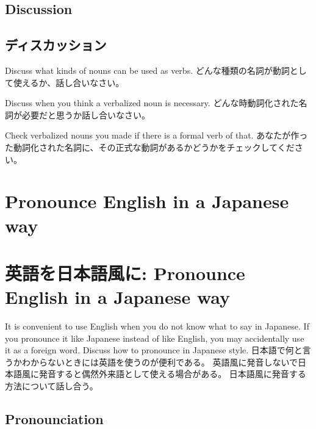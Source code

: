 \documentclass[uplatex,dvipdfmx,b5paper,english,10pt]{jsbook}
\begin{document}
\ifEnglish
\subsection{Discussion}
\else
\subsection{ディスカッション}
\fi

\begin{toiquestion}
\ifEnglish
Discuss what kinds of nouns can be used as verbs.
\else
どんな種類の名詞が動詞として使えるか、話し合いなさい。
\fi
\end{toiquestion}
\begin{toiquestion}
\ifEnglish
Discuss when you think a verbalized noun is necessary.
\else
どんな時動詞化された名詞が必要だと思うか話し合いなさい。
\fi
\end{toiquestion}
\begin{toiquestion}
\ifEnglish
Check verbalized nouns you made if there is a formal verb of that.
\else
あなたが作った動詞化された名詞に、その正式な動詞があるかどうかをチェックしてください。
\fi
\end{toiquestion}

%

\ifEnglish
\section{Pronounce English in a Japanese way}
\else
\section{英語を日本語風に: Pronounce English in a Japanese way}
\fi

\begin{toiquestion}
\ifEnglish
It is convenient to use English when you do not know what to say in Japanese.
If you pronounce it like Japanese instead of like English, you may accidentally use it as a foreign word.
Discuss how to pronounce in Japanese style.
\else
日本語で何と言うかわからないときには英語を使うのが便利である。
英語風に発音しないで日本語風に発音すると偶然外来語として使える場合がある。
日本語風に発音する方法について話し合う。
\fi
\end{toiquestion}

\ifEnglish
\subsection{Pronounciation}
\else
\end{document}
